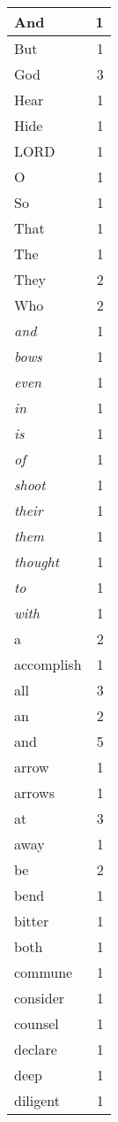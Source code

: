 \begin{center}
\begin{longtable}{l|r}
\hline \hline
\endlastfoot
And & 1 \\ \hline
But & 1 \\ \hline
God & 3 \\ \hline
Hear & 1 \\ \hline
Hide & 1 \\ \hline
LORD & 1 \\ \hline
O & 1 \\ \hline
So & 1 \\ \hline
That & 1 \\ \hline
The & 1 \\ \hline
They & 2 \\ \hline
Who & 2 \\ \hline
\emph{and} & 1 \\ \hline
\emph{bows} & 1 \\ \hline
\emph{even} & 1 \\ \hline
\emph{in} & 1 \\ \hline
\emph{is} & 1 \\ \hline
\emph{of} & 1 \\ \hline
\emph{shoot} & 1 \\ \hline
\emph{their} & 1 \\ \hline
\emph{them} & 1 \\ \hline
\emph{thought} & 1 \\ \hline
\emph{to} & 1 \\ \hline
\emph{with} & 1 \\ \hline
a & 2 \\ \hline
accomplish & 1 \\ \hline
all & 3 \\ \hline
an & 2 \\ \hline
and & 5 \\ \hline
arrow & 1 \\ \hline
arrows & 1 \\ \hline
at & 3 \\ \hline
away & 1 \\ \hline
be & 2 \\ \hline
bend & 1 \\ \hline
bitter & 1 \\ \hline
both & 1 \\ \hline
commune & 1 \\ \hline
consider & 1 \\ \hline
counsel & 1 \\ \hline
declare & 1 \\ \hline
deep & 1 \\ \hline
diligent & 1 \\ \hline

\end{longtable}
\end{center}
